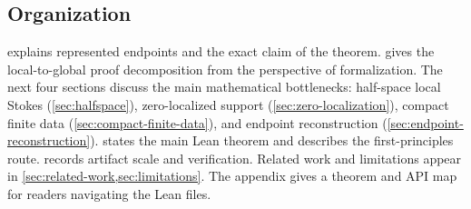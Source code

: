 \subsection{Organization}

 explains represented endpoints and the exact
claim of the theorem.   gives the local-to-global
proof decomposition from the perspective of formalization.  The next four
sections discuss the main mathematical bottlenecks: half-space local Stokes
(\cref{sec:halfspace}), zero-localized support (\cref{sec:zero-localization}),
compact finite data (\cref{sec:compact-finite-data}), and endpoint
reconstruction (\cref{sec:endpoint-reconstruction}).  
states the main Lean theorem and describes the first-principles route.
 records artifact scale and verification.  Related
work and limitations appear in \cref{sec:related-work,sec:limitations}.  The
appendix gives a theorem and API map for readers navigating the Lean files.
